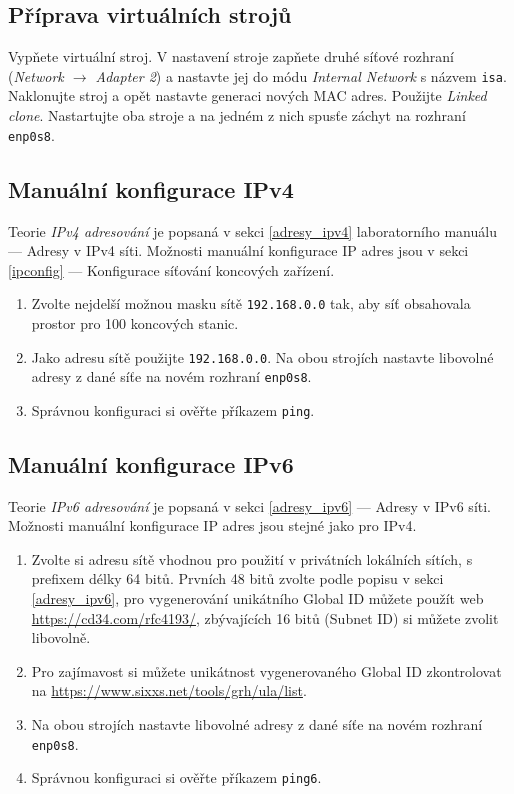 \subsection*{Příprava virtuálních strojů}
Vypňete virtuální stroj.
V nastavení stroje zapňete druhé síťové rozhraní (\textit{Network $\rightarrow$ Adapter 2}) a nastavte jej do módu \textit{Internal Network} s názvem \texttt{isa}.
Naklonujte stroj a opět nastavte generaci nových MAC adres. Použijte \textit{Linked clone}.
Nastartujte oba stroje a na jedném z nich spusťe záchyt na rozhraní \texttt{enp0s8}.

\subsection{Manuální konfigurace IPv4}

Teorie \emph{IPv4 adresování} je popsaná v sekci \ref{adresy_ipv4} laboratorního manuálu --- Adresy v IPv4 síti.
Možnosti manuální konfigurace IP adres jsou v sekci \ref{ipconfig} --- Konfigurace síťování koncových zařízení.

\begin{enumerate}
    \item Zvolte nejdelší možnou masku sítě \texttt{192.168.0.0} tak, aby síť obsahovala prostor pro 100 koncových stanic.
    \item Jako adresu sítě použijte \texttt{192.168.0.0}.
      Na obou strojích nastavte libovolné adresy z dané síťe na novém rozhraní \texttt{enp0s8}.
    \item Správnou konfiguraci si ověřte příkazem {\tt ping}.
\end{enumerate}

\subsection{Manuální konfigurace IPv6}
Teorie \emph{IPv6 adresování} je popsaná v sekci \ref{adresy_ipv6} --- Adresy v IPv6 síti.
Možnosti manuální konfigurace IP adres jsou stejné jako pro IPv4.

\begin{enumerate}
    \item Zvolte si adresu sítě vhodnou pro použití v privátních lokálních
        sítích, s prefixem délky 64 bitů. Prvních 48 bitů zvolte podle popisu v
        sekci \ref{adresy_ipv6}, pro vygenerování unikátního Global ID můžete
        použít web \url{https://cd34.com/rfc4193/}, zbývajících 16 bitů (Subnet
        ID) si můžete zvolit libovolně.
    \item Pro zajímavost si můžete unikátnost vygenerovaného Global ID
        zkontrolovat na \url{https://www.sixxs.net/tools/grh/ula/list}.
    \item Na obou strojích nastavte libovolné adresy z dané síťe na novém rozhraní \texttt{enp0s8}.
    \item Správnou konfiguraci si ověřte příkazem {\tt ping6}.
\end{enumerate}

